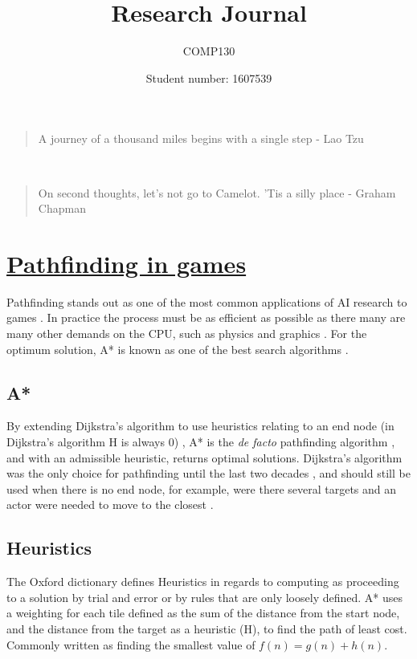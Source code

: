\documentclass{scrartcl}
\title
{Research Journal}
\subtitle{COMP130}
\author{Student number: 1607539}
\begin{document}
\maketitle

\blockquote {A journey of a thousand miles begins with a single step - Lao Tzu}\\
\indent\blockquote {On second thoughts, let's not go to Camelot. 'Tis a silly place - Graham Chapman}%

\section*{\underline{Pathfinding in games}}

Pathfinding stands out as one of the most common applications of AI research to games \cite{botea2013pathfinding}.  In practice the process must be as efficient as possible as there many are many other demands on the CPU, such as physics and graphics \cite{sturtevant2007memory}.  For the optimum solution, A* is known as one of the best search algorithms \cite{algfoor2015comprehensive}.

\subsection*{A*}

By extending Dijkstra's algorithm to use heuristics relating to an end node (in Dijkstra's algorithm H is always 0) \cite{lester2005pathfinding}, A* is the \textit{de facto} pathfinding algorithm \cite{leigh2007using}, and with an admissible heuristic, returns optimal solutions.  Dijkstra's algorithm was the only choice for pathfinding until the last two decades \cite{cui2011direction}, and should still be used when there is no end node, for example, were there several targets and an actor were needed to move to the closest \cite{lester2005pathfinding}.

\subsection*{Heuristics}

The Oxford dictionary defines Heuristics in regards to computing as proceeding to a solution by trial and error or by rules that are only loosely defined.  A* uses a weighting for each tile defined as the sum of the distance from the start node, and the distance from the target as a heuristic (H), to find the path of least cost. Commonly written as finding the smallest value of $f(n) = g(n) + h(n)$.  
\end{document}
